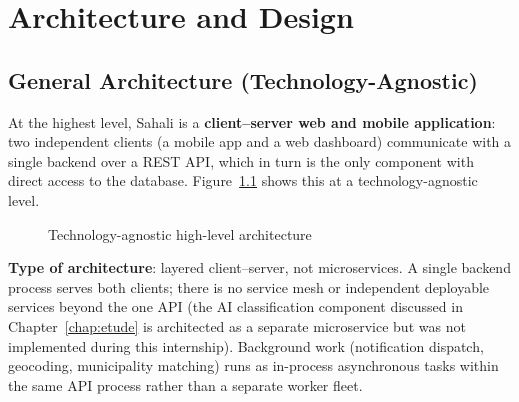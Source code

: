 \chapter{Architecture and Design}
\label{chap:architecture}

\section{General Architecture (Technology-Agnostic)}

At the highest level, Sahali is a \textbf{client--server web and mobile application}: two independent clients (a mobile app and a web dashboard) communicate with a single backend over a REST API, which in turn is the only component with direct access to the database. Figure~\ref{fig:arch-generic} shows this at a technology-agnostic level.

\begin{figure}[h!]
\centering
{}
\caption{Technology-agnostic high-level architecture}
\label{fig:arch-generic}
\end{figure}

\textbf{Type of architecture}: layered client--server, not microservices. A single backend process serves both clients; there is no service mesh or independent deployable services beyond the one API (the AI classification component discussed in Chapter~\ref{chap:etude} is architected as a separate microservice but was not implemented during this internship). Background work (notification dispatch, geocoding, municipality matching) runs as in-process asynchronous tasks within the same API process rather than a separate worker fleet.

